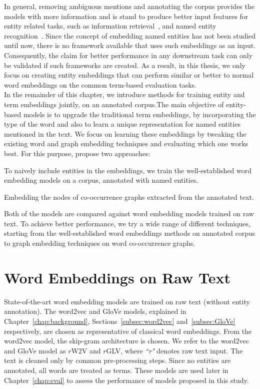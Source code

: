 In general, removing ambiguous mentions and annotating the corpus provides the models with more information and is stand to produce better input features for entity related tasks, such as information retrieval~, and named entity recognition~. Since the concept of embedding named entities has not been studied until now, there is no framework available that uses such embeddings as an input. Consequently, the claim for better performance in any downstream task can only be validated if such frameworks are created. As a result, in this thesis, we only focus on creating entity embeddings that can perform similar or better to normal word embeddings on the common term-based evaluation tasks.\\
In the remainder of this chapter, we introduce methods for training entity and term embeddings jointly, on an annotated corpus.The main objective of entity-based models is to upgrade the traditional term embeddings, by incorporating the type of the word and also to learn a unique representation for named entities mentioned in the text. We focus on learning these embeddings by tweaking the existing word and graph embedding techniques and evaluating which one works best. For this purpose, propose two approaches: 
\begin{compactenum}
\item To naively include entities in the embeddings, we train the well-established word embedding models on a corpus, annotated with named entities. 
\item Embedding the nodes of co-occurrence graphs extracted from the annotated text. 
\end{compactenum}
Both of the models are compared against word embedding models trained on raw text. To achieve better performance, we try a wide range of different techniques, starting from the well-established word embeddings methods on annotated corpus to graph embedding techniques on word co-occurrence graphs. 

\section{Word Embeddings on Raw Text}\label{sec:raw}
State-of-the-art word embedding models are trained on raw text (without entity annotation). The word2vec and GloVe models, explained in Chapter~\ref{chap:background}, Sections~\ref{subsec:word2vec} and~\ref{subsec:GloVe} respectively, are chosen as representative of classical word embeddings. From the word2vec model, the skip-gram architecture is chosen. We refer to the word2vec and GloVe model as $r$W2V and  $r$GLV, where \emph{``r"} denotes raw text input. The text is cleaned only by common pre-processing steps. Since no entities are annotated, all words are treated as terms. These models are used later in Chapter~\ref{chap:eval} to assess the performance of models proposed in this study. 

